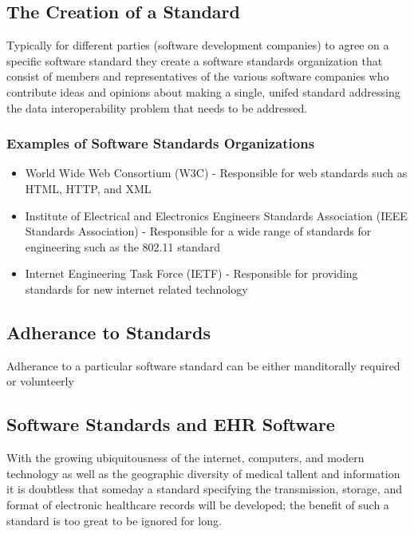 \documentclass[12pt]{article}
\begin{document}
\subsection{The Creation of a Standard}
Typically for different parties (software development companies) to agree on a specific software standard they create a software standards organization that consist of members and representatives of the various software companies who contribute ideas and opinions about making a single, unifed standard addressing the data interoperability problem that needs to be addressed.

\subsubsection{ Examples of Software Standards Organizations}

\begin{itemize}
\item World Wide Web Consortium (W3C) - Responsible for web standards such as HTML, HTTP, and XML 
\item Institute of Electrical and Electronics Engineers Standards Association (IEEE Standards Association) - Responsible for a wide range of standards for engineering such as the 802.11 standard
\item Internet Engineering Task Force (IETF) - Responsible for providing standards for new internet related technology 
\end{itemize}

\subsection{ Adherance to Standards}
Adherance to a particular software standard can be either manditorally required or volunteerly 


\subsection{Software Standards and EHR Software}
With the growing ubiquitousness of the internet, computers, and modern technology as well as the geographic diversity of medical tallent and information it is doubtless that someday a standard specifying the transmission, storage, and format of electronic healthcare records will be developed; the benefit of such a standard is too great to be ignored for long.
\end{document}
